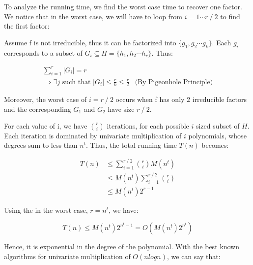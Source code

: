 To analyze the running time, we find the worst case time to recover one factor. We notice that in the worst case, we will have to loop from $i = 1 \cdots r \fracslash 2$ to find the first factor:

Assume f is not irreducible, thus it can be factorized into $\{g_1, g_2 \cdots g_k\}$. Each $g_i$ corresponds to a subset of $G_i \subseteq H = \{h_1, h_2 \cdots h_r\}$. Thus:

\begin{align*}
    \sum_{i=1}^r \lvert G_i \rvert = r \\
    \Rightarrow \exists j \text{ such that } \lvert G_i \rvert \le \frac{r}{k} \le \frac{r}{2} &\text{(By Pigeonhole Principle)}
\end{align*}

Moreover, the worst case of $i = r \fracslash 2$ occurs when f has only 2 irreducible factors and the corresponding $G_1$ and $G_2$ have size $r \fracslash 2$.

For each value of i, we have ${r \choose i}$ iterations, for each possible $i$ sized subset of $H$. Each iteration is dominated by univariate multiplication of $i$ polynomials, whose degrees sum to less than $n^t$. Thus, the total running time $T(n)$ becomes:

\begin{align*}
    T(n) &\le \sum_{i=1}^{r \fracslash 2} {r \choose i} M(n^t) \\
    &\le M(n^t) \sum_{i=1}^{r \fracslash 2} {r \choose i} \\
    &\le M(n^t) 2^{r-1}
\end{align*}

Using the in the worst case, $r = n^t$, we have:

\[
T(n) \le M(n^t) 2^{n^t-1} = O\left(M(n^t) 2^{n^t}\right)
\]

Hence, it is exponential in the degree of the polynomial. With the best known algorithms for univariate multiplication of $O(n log n)$, we can say that:

